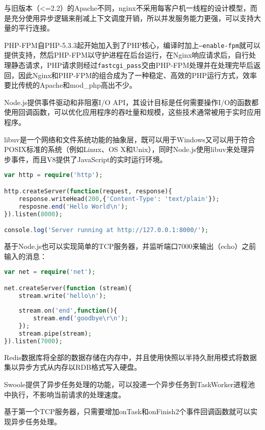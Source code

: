 与旧版本（<=2.2）的Apache不同，nginx不采用每客户机一线程的设计模型，而是充分使用异步逻辑来削减上下文调度开销，所以并发服务能力更强，可以支持大量的平行连接。

PHP-FPM自PHP-5.3.3起开始加入到了PHP核心，编译时加上\texttt{--enable-fpm}就可以提供支持，然后PHP-FPM以守护进程在后台运行，在Nginx响应请求后，自行处理静态请求，PHP请求则经过\texttt{fastcgi\_pass}交由PHP-FPM处理并在处理完毕后返回，因此Nginx和PHP-FPM的组合成为了一种稳定、高效的PHP运行方式，效率要比传统的Apache和mod\_php高出不少。

Node.js提供事件驱动和非阻塞I/O API，其设计目标是任何需要操作I/O的函数都使用回调函数，可以优化应用程序的吞吐量和规模，这些技术通常被用于实时应用程序。

libuv是一个网络和文件系统功能的抽象层，既可以用于Windows又可以用于符合POSIX标准的系统（例如Linux、OS X和Unix），同时Node.js使用libuv来处理异步事件，而且V8提供了JavaScript的实时运行环境。

\begin{lstlisting}[language=PHP]
var http = require('http');

http.createServer(function(request, response){
	response.writeHead(200,{'Content-Type': 'text/plain'});
	resposne.end('Hello World\n');
}).listen(8000);

console.log('Server running at http://127.0.0.1:8000/');
\end{lstlisting}

基于Node.js也可以实现简单的TCP服务器，并监听端口7000来输出（echo）之前输入的消息：

\begin{lstlisting}[language=PHP]
var net = require('net');

net.createServer(function (stream){
	stream.write('hello\n');
	
	stream.on('end',function(){
		stream.end('goodbye\r\n');
	});
	stream.pipe(stream);
}).listen(7000);
\end{lstlisting}

Redis数据库将全部的数据存储在内存中，并且使用快照以半持久耐用模式将数据集以异步方式从内存以RDB格式写入硬盘。

Swoole提供了异步任务处理的功能，可以投递一个异步任务到TaskWorker进程池中执行，不影响当前请求的处理速度。

基于第一个TCP服务器，只需要增加onTask和onFinish2个事件回调函数就可以实现异步任务处理。



